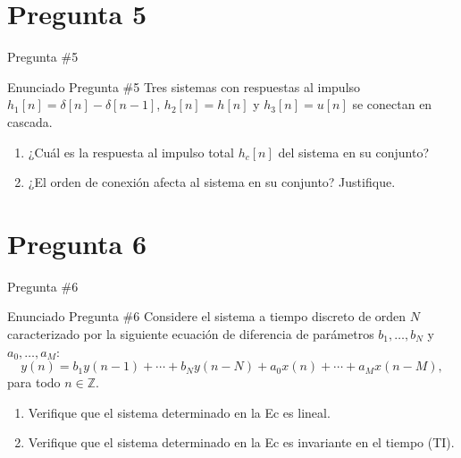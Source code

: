 \documentclass[
    10pt,
    aspectratio=169,
    xcolor={dvipsnames},
    spanish,
    ]{beamer}
\begin{document}
\section{Pregunta 5}
\begin{frame}{Pregunta \#5}
\begin{block}{Enunciado Pregunta \#5}
  Tres sistemas con respuestas al impulso \(h_1[n]=\delta[n]-\delta[n-1]\), \(h_2[n]=h[n]\) y \(h_3[n]=u[n]\) se conectan en cascada.
\begin{enumerate}
  \item ¿Cuál es la respuesta al impulso total \(h_c[n]\) del sistema en su conjunto?
  \item ¿El orden de conexión afecta al sistema en su conjunto? Justifique.
\end{enumerate}
\end{block}
\end{frame}
\section{Pregunta 6}
\begin{frame}{Pregunta \#6}
\begin{block}{Enunciado Pregunta \#6}
  Considere el sistema a tiempo discreto de orden $N$ caracterizado por la siguiente ecuación de diferencia de parámetros $b_1,\ldots,b_N$ y $a_0,\ldots,a_M$:
\begin{equation}
\label{eq:edo}
 y(n) = b_1 y(n-1)+\cdots+b_N y(n-N) + a_0 x(n)+\cdots+a_M x(n-M),
\end{equation}
para todo $n\in\mathbb{Z}$.

\begin{enumerate}
  \item Verifique que el sistema determinado en la Ec es lineal.
  \item Verifique que el sistema determinado en la Ec es invariante en el tiempo (TI).
\end{enumerate}
\end{block}
\end{frame}
\end{document}
